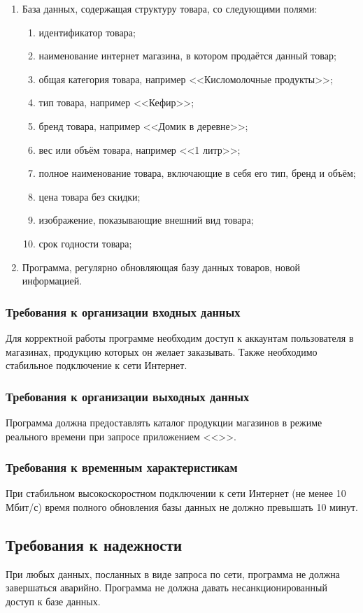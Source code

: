 \documentclass[a4paper,12pt]{article}
\begin{document}
  \begin{enumerate}
    \item База данных, содержащая структуру товара, со следующими полями:
    \begin{enumerate}
      \item идентификатор товара;
      \item наименование интернет магазина, в котором продаётся данный товар;
      \item общая категория товара, например <<Кисломолочные продукты>>;
      \item тип товара, например <<Кефир>>;
      \item бренд товара, например <<Домик в деревне>>;
      \item вес или объём товара, например <<1 литр>>;
      \item полное наименование товара, включающие в себя его тип, бренд и объём;
      \item цена товара без скидки;
      \item изображение, показывающие внешний вид товара;
      \item срок годности товара;
    \end{enumerate}
    \item Программа, регулярно обновляющая базу данных товаров, новой информацией.
  \end{enumerate}

  \subsubsection{Требования к организации входных данных}
  Для корректной работы программе необходим доступ к аккаунтам пользователя в магазинах, продукцию которых он желает заказывать.
  Также необходимо стабильное подключение к сети Интернет.
  \subsubsection{Требования к организации выходных данных}
  Программа должна предоставлять каталог продукции магазинов в режиме реального времени при запросе приложением <<\CRTname>>.
  \subsubsection{Требования к временным характеристикам}
  При стабильном высокоскоростном подключении к сети Интернет (не менее 10 Мбит/с) время полного обновления базы данных
  не должно превышать 10 минут.
  \subsection{Требования к надежности}
  При любых данных, посланных в виде запроса по сети, программа не должна завершаться аварийно.
  Программа не должна давать несанкционированный доступ к базе данных.
\end{document}
